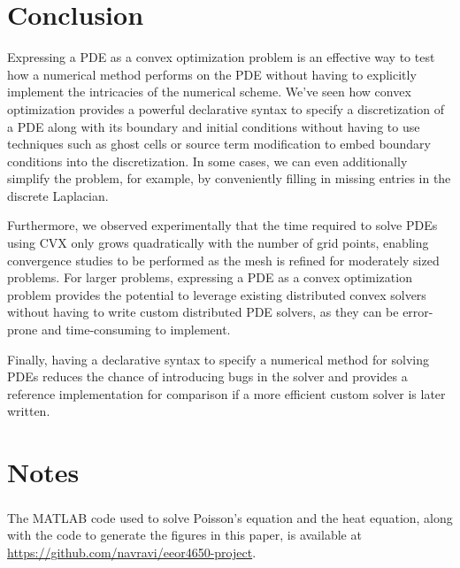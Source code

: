 \documentclass[conference]{IEEEtran}
\begin{document}
\section{Conclusion}

Expressing a PDE as a convex optimization problem is an effective way to test how a numerical method performs on the PDE without having to explicitly implement the intricacies of the numerical scheme. We've seen how convex optimization provides a powerful declarative syntax to specify a discretization of a PDE along with its boundary and initial conditions without having to use techniques such as ghost cells or source term modification to embed boundary conditions into the discretization. In some cases, we can even additionally simplify the problem, for example, by conveniently filling in missing entries in the discrete Laplacian.

Furthermore, we observed experimentally that the time required to solve PDEs using CVX only grows quadratically with the number of grid points, enabling convergence studies to be performed as the mesh is refined for moderately sized problems. For larger problems, expressing a PDE as a convex optimization problem provides the potential to leverage existing distributed convex solvers without having to write custom distributed PDE solvers, as they can be error-prone and time-consuming to implement.

Finally, having a declarative syntax to specify a numerical method for solving PDEs reduces the chance of introducing bugs in the solver and provides a reference implementation for comparison if a more efficient custom solver is later written.


\section*{Notes}

The MATLAB\textsuperscript{\textregistered} code used to solve Poisson's equation and the heat equation, along with the code to generate the figures in this paper, is available at \url{https://github.com/navravi/eeor4650-project}.






\end{document}
